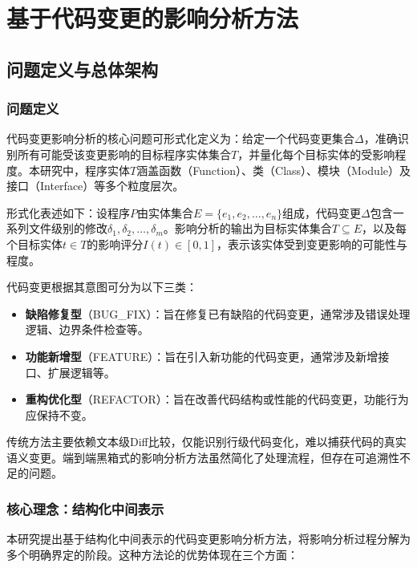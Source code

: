 
\chapter{基于代码变更的影响分析方法}
\section{问题定义与总体架构}
\subsection{问题定义}
代码变更影响分析的核心问题可形式化定义为：给定一个代码变更集合$\Delta$，准确识别所有可能受该变更影响的目标程序实体集合$T$，并量化每个目标实体的受影响程度。本研究中，程序实体$T$涵盖函数（Function）、类（Class）、模块（Module）及接口（Interface）等多个粒度层次。

形式化表述如下：设程序$P$由实体集合$E = \{e_1, e_2, \ldots, e_n\}$组成，代码变更$\Delta$包含一系列文件级别的修改$\delta_1, \delta_2, \ldots, \delta_m$。影响分析的输出为目标实体集合$T \subseteq E$，以及每个目标实体$t \in T$的影响评分$I(t) \in [0, 1]$，表示该实体受到变更影响的可能性与程度。

代码变更根据其意图可分为以下三类：
\begin{itemize}
    \item \textbf{缺陷修复型}（BUG\_FIX）：旨在修复已有缺陷的代码变更，通常涉及错误处理逻辑、边界条件检查等。
    \item \textbf{功能新增型}（FEATURE）：旨在引入新功能的代码变更，通常涉及新增接口、扩展逻辑等。
    \item \textbf{重构优化型}（REFACTOR）：旨在改善代码结构或性能的代码变更，功能行为应保持不变。
\end{itemize}

传统方法主要依赖文本级Diff比较，仅能识别行级代码变化，难以捕获代码的真实语义变更。端到端黑箱式的影响分析方法虽然简化了处理流程，但存在可追溯性不足的问题。

\subsection{核心理念：结构化中间表示}
本研究提出基于结构化中间表示的代码变更影响分析方法，将影响分析过程分解为多个明确界定的阶段。这种方法论的优势体现在三个方面：

